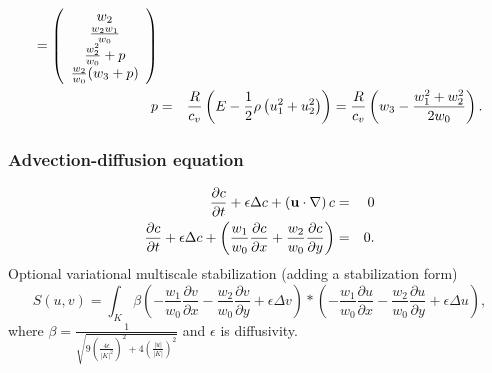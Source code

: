 \documentclass{beamer}
\begin{document}
\begin{frame}
\begin{eqnarray}
			 = \left(\begin{array}{c} w_2\\ \frac{w_2w_1}{w_0}\\ \frac{w_2^2}{w_0} + p\\ \frac{w_2}{w_0}(w_3+p) \end{array} \right)\\
p         & = & {R\over c_v} \left(E-\frac{1}{2} \rho\left(u_1^2 + u_2^2\right)\right)= {R\over c_v} \left(w_3-{w_1^2+w_2^2\over{2} w_0}\right).
\end{eqnarray}
\end{frame}

\begin{frame}
\frametitle{Advection-diffusion equation}
\begin{eqnarray}
{\partial c \over\partial t} + \epsilon\Delta{c} + \left(\bf{u}\cdot\nabla\right) c & = & 0\\
{\partial c \over\partial t} + \epsilon\Delta{c} + \left(\frac{w_1}{w_0} \frac{\partial c}{\partial x} + \frac{w_2}{w_0} \frac{\partial c}{\partial y}\right) & = & 0.
\end{eqnarray}
Optional variational multiscale stabilization (adding a stabilization form)
\begin{equation}
S\left(u, v\right) = \int_{K} \beta \left(-\frac{w_1}{w_0} \frac{\partial v}{\partial x} - \frac{w_2}{w_0} \frac{\partial v}{\partial y} + \epsilon \Delta v\right) * \left(-\frac{w_1}{w_0} \frac{\partial u}{\partial x} - \frac{w_2}{w_0} \frac{\partial u}{\partial y} + \epsilon \Delta u\right),
\end{equation}
where
$\beta = \frac{1}{\sqrt{9 \left(\frac{4\epsilon}{|K|^2}\right)^2 + 4 \left(\frac{|u|}{|K|}\right)^2}}$ 
and $\epsilon$ is diffusivity.
\end{frame}
\end{document}

